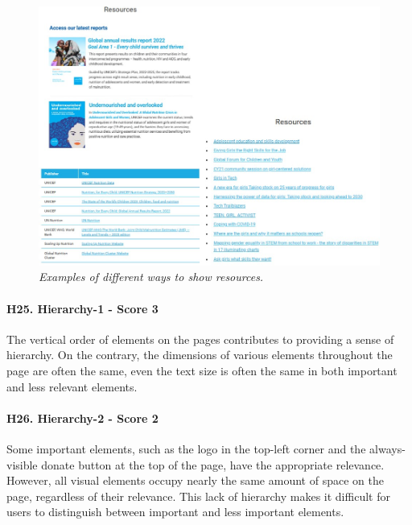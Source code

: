 \begin{figure}[!h]
	\begin{center}
		\includegraphics[width=\textwidth]{FinalScores29.jpg}
		\captionsetup{font=small}
		\caption{\textit{Examples of different ways to show resources.}}
	\end{center}
\end{figure}
\newline
\newline \paragraph{H25. Hierarchy-1 - Score 3}  \label{subsec:H25}	The vertical order of elements on the pages contributes to providing a sense of hierarchy. On the contrary, the dimensions of various elements throughout the page are often the same, even the text size is often the same in both important and less relevant elements.
\newline
\newline \paragraph{H26. Hierarchy-2 - Score 2}	\label{subsec:H26} Some important elements, such as the logo in the top-left corner and the always-visible donate button at the top of the page, have the appropriate relevance.
\newline However, all visual elements occupy nearly the same amount of space on the page, regardless of their relevance. This lack of hierarchy makes it difficult for users to distinguish between important and less important elements. 
